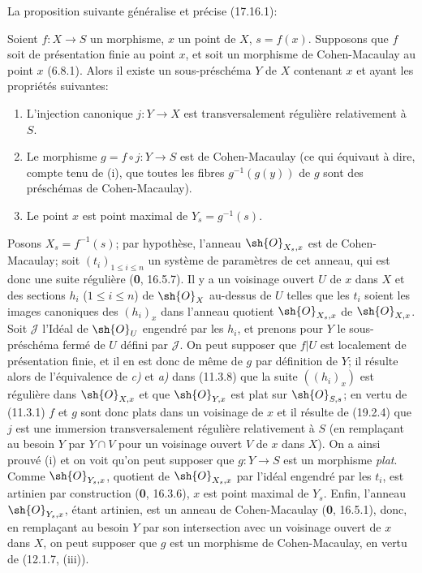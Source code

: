 La proposition suivante généralise et précise (17.16.1):

\begin{proposition}[19.2.9]
\label{IV.19.2.9}
Soient $f:X\to S$ un morphisme, $x$ un point de $X$, $s=f(x)$. Supposons que $f$ soit de présentation finie au point $x$, et soit un morphisme de Cohen-Macaulay au point $x$ \textup{(6.8.1)}. Alors il existe un sous-préschéma $Y$ de $X$ contenant $x$ et ayant les propriétés suivantes:
\begin{enumerate}
  \item[\textup{(i)}] L'injection canonique $j:Y\to X$ est transversalement régulière relativement à $S$.
  \item[\textup{(ii)}] Le morphisme $g=f\circ j:Y\to S$ est de Cohen-Macaulay \textup{(ce qui équivaut à dire, compte tenu de (i), que toutes les fibres $g^{-1}(g(y))$ de $g$ sont des préschémas de Cohen-Macaulay)}.
  \item[\textup{(iii)}] Le point $x$ est point maximal de $Y_s=g^{-1}(s)$.
\end{enumerate}
\end{proposition}

Posons $X_s=f^{-1}(s)$; par hypothèse, l'anneau $\sh{O}_{X_s,x}$ est de Cohen-Macaulay; soit $(t_i)_{1\leq i\leq n}$ un système de paramètres de cet anneau, qui est donc une suite régulière (\textbf{0}, 16.5.7). Il y a un voisinage ouvert $U$ de $x$ dans $X$ et des sections $h_i$ ($1\leq i\leq n$) de $\sh{O}_X$ au-dessus de $U$ telles que les $t_i$ soient les images canoniques des $(h_i)_x$ dans l'anneau quotient $\sh{O}_{X_s,x}$ de $\sh{O}_{X,x}$. Soit $\mathscr J$ l'Idéal de $\sh{O}_U$ engendré par les $h_i$, et prenons pour $Y$ le sous-préschéma fermé de $U$ défini par $\mathscr J$. On peut supposer que $f|U$ est localement de présentation finie, et il en est donc de même de $g$ par définition de $Y$; il résulte alors de l'équivalence de \emph{c)} et \emph{a)} dans (11.3.8) que la suite $((h_i)_x)$ est régulière dans $\sh{O}_{X,x}$ et que $\sh{O}_{Y,x}$ est plat sur $\sh{O}_{S,s}$; en vertu de (11.3.1) $f$ et $g$ sont donc plats dans un voisinage de $x$ et il résulte de (19.2.4) que $j$ est une immersion transversalement régulière relativement à $S$ (en remplaçant au besoin $Y$ par $Y\cap V$ pour un voisinage ouvert $V$ de $x$ dans $X$). On a ainsi prouvé (i) et on voit qu'on peut supposer que $g:Y\to S$ est un morphisme \emph{plat}. Comme $\sh{O}_{Y_s,x}$, quotient de $\sh{O}_{X_s,x}$ par l'idéal engendré par les $t_i$, est artinien par construction (\textbf{0}, 16.3.6), $x$ est point maximal de $Y_s$. Enfin, l'anneau $\sh{O}_{Y_s,x}$, étant artinien, est un anneau de Cohen-Macaulay (\textbf{0}, 16.5.1), donc, en remplaçant au besoin $Y$ par son intersection avec un voisinage ouvert de $x$ dans $X$, on peut supposer que $g$ est un morphisme de Cohen-Macaulay, en vertu de (12.1.7, (iii)).

